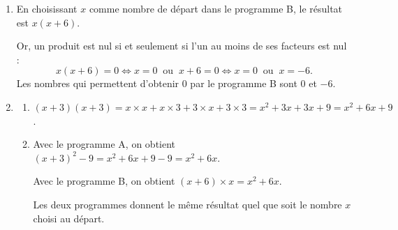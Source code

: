 \begin{enumerate}
\begin{enumerate}
		\item Par lecture graphique, les antécédents de $-5$ par la fonction $f$ sont $-5$ et $-1$.
	\end{enumerate}

	\item En choisissant $x$ comme nombre de départ dans le programme B, le résultat est $x(x+6)$.
	
	Or, un produit est nul si et seulement si l'un au moins de ses facteurs est nul :
	\[x(x+6)=0 \iff x=0 \ \text{ ou } \ x+6=0 \iff x=0 \ \text{ ou } \ x=-6.\]
	Les nombres qui permettent d'obtenir 0 par le programme B sont 0 et $-6$.

	\item
	\begin{enumerate}
		\item $(x+3)(x+3)=x\times x+x\times 3+3\times x+3\times 3=x^{2}+3x+3x+9=x^{2}+6x+9$.

		\item Avec le programme A, on obtient $(x+3)^{2}-9=x^{2}+6x+9-9=x^{2}+6x$.

		Avec le programme B, on obtient $(x+6)\times x=x^{2}+6x$.

		Les deux programmes donnent le même résultat quel que soit le nombre $x$ choisi au départ.
	\end{enumerate}
\end{enumerate}

